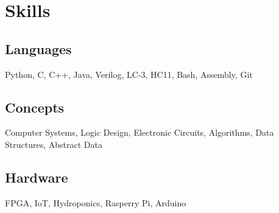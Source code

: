 \documentclass[12pt,letterpaper]{report}
\newcommand{\verticalgap}{0em}
\newcommand{\skillspace}{1em}
\begin{document}
	\begin{minipage}[t]{0.2\linewidth}
		\vspace{\verticalgap}
    \section*{Skills}
    \raggedright
    \subsection*{Languages}
        Python, C, C++, Java, Verilog, LC-3, HC11, Bash, Assembly, Git 
	\vspace{\skillspace}
	\subsection*{Concepts}
    Computer Systems, Logic Design, Electronic Circuits, Algorithms, \newline Data Structures, Abstract Data
      \vspace{\skillspace}
    \subsection*{Hardware}
         FPGA, IoT, Hydroponics, Rasperry Pi, Arduino
	\end{minipage}
%	
\end{document}
